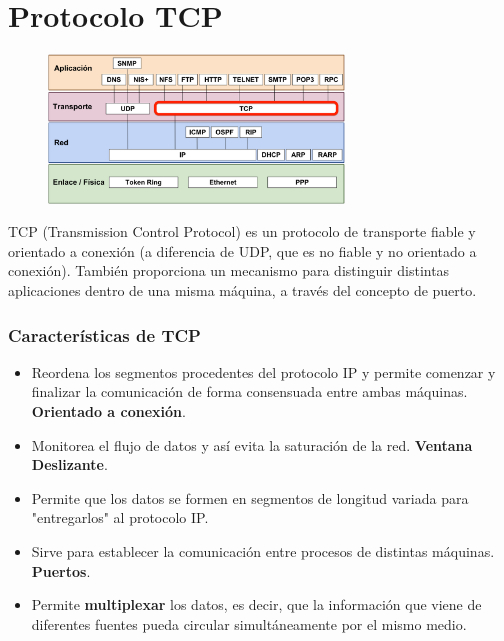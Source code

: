 \section{Protocolo TCP}
\begin{figure}[H]
    \centering
    \includegraphics[width=0.7\textwidth]{img/TCP.png}
\end{figure}
TCP (Transmission Control Protocol) es un protocolo de transporte fiable y orientado a conexión (a diferencia de UDP, que es no fiable y no orientado a conexión). También proporciona un mecanismo para distinguir distintas aplicaciones dentro de una misma máquina, a través del concepto de puerto.

\subsubsection{Características de TCP}
\begin{itemize}
    \item Reordena los segmentos procedentes del protocolo IP y permite comenzar y finalizar la comunicación de forma consensuada entre ambas máquinas. \textbf{Orientado a conexión}.
    \item Monitorea el flujo de datos y así evita la saturación de la red. \textbf{Ventana Deslizante}.
    \item Permite que los datos se formen en segmentos de longitud variada para "entregarlos" al protocolo IP.
    \item Sirve para establecer la comunicación entre procesos de distintas máquinas. \textbf{Puertos}.
    \item Permite \textbf{multiplexar} los datos, es decir, que la información que viene de diferentes fuentes pueda circular simultáneamente por el mismo medio.
\end{itemize}
